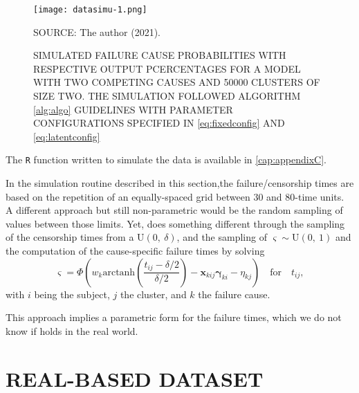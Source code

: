 \begin{figure}[H]
 \setlength{\abovecaptionskip}{.0001pt}
 \caption{SIMULATED FAILURE CAUSE PROBABILITIES WITH RESPECTIVE OUTPUT
          PCERCENTAGES FOR A MODEL WITH TWO COMPETING CAUSES AND 50000
          CLUSTERS OF SIZE TWO. THE SIMULATION FOLLOWED ALGORITHM
          \autoref{alg:algo} GUIDELINES WITH PARAMETER CONFIGURATIONS
          SPECIFIED IN \autoref{eq:fixedconfig} AND
          \autoref{eq:latentconfig}}
 \vspace{0.2cm}\centering
 \texttt{[image: datasimu-1.png]}\\
 \begin{footnotesize}
  SOURCE: The author (2021).
 \end{footnotesize}
 \label{fig:datasimu}
\end{figure}

The \texttt{R} function written to simulate the data is available in
\autoref{cap:appendixC}.

In the simulation routine described in this section,the
failure/censorship times are based on the repetition of an
equally-spaced grid between 30 and 80-time units. A different approach
but still non-parametric would be the random sampling of values between
those limits. Yet,  does something different through
the sampling of the censorship times from a \(\text{U}(0,~\delta)\), and
the sampling of \(\varsigma\sim\text{U}(0,~1)\) and the computation of
the cause-specific failure times by solving
\[
 \varsigma =
 \Phi\left(w_{k}
           \text{arctanh}\left(\frac{t_{ij}-\delta/2}{\delta/2}\right) -
           \bm{x}_{kij}\bm{\gamma}_{ki} - \eta_{kj}
     \right)
 \quad\text{for}\quad t_{ij},
\]
with \(i\) being the subject, \(j\) the cluster, and \(k\) the failure
cause.

This approach implies a parametric form for the failure times, which we
do not know if holds in the real world.

\section{REAL-BASED DATASET}
\label{cap:data}

